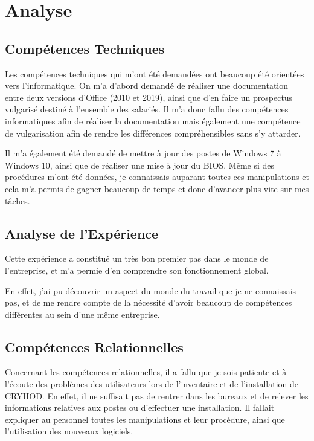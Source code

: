 \chapter{Analyse}


\section{Compétences Techniques}

Les compétences techniques qui m'ont été demandées ont beaucoup été orientées vers l'informatique.
On m'a d'abord demandé de réaliser une documentation entre deux versions d'Office (2010 et 2019), ainsi que d'en faire un prospectus vulgarisé destiné à l'ensemble des salariés.
Il m'a donc fallu des compétences informatiques afin de réaliser la documentation mais également une compétence de vulgarisation afin de rendre les différences compréhensibles sans s'y attarder.

Il m'a également été demandé de mettre à jour des postes de Windows 7 à Windows 10, ainsi que de réaliser une mise à jour du BIOS.
Même si des procédures m'ont été données, je connaissais auparant toutes ces manipulations et cela m'a permis de gagner beaucoup de temps et donc d'avancer plus vite sur mes tâches.

\section{Analyse de l'Expérience}

Cette expérience a constitué un très bon premier pas dans le monde de l'entreprise, et m'a permie d'en comprendre son fonctionnement global.

En effet, j'ai pu découvrir un aspect du monde du travail que je ne connaissais pas, et de me rendre compte de la nécessité d'avoir beaucoup de compétences différentes au sein d'une même entreprise.


\section{Compétences Relationnelles}

Concernant les compétences relationnelles, il a fallu que je sois patiente et à l'écoute des problèmes des utilisateurs lors de l'inventaire et de l'installation de CRYHOD. 
En effet, il ne suffisait pas de rentrer dans les bureaux et de relever les informations relatives aux postes ou d'effectuer une installation. Il fallait expliquer au personnel toutes les manipulations et leur procédure, ainsi que l'utilisation des nouveaux logiciels.

